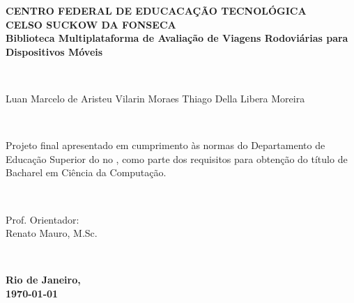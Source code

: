 \documentclass[12pt]{report} %
\begin{document}
	\thispagestyle{empty} %
	\center %
	
	\begin{minipage}{\textwidth}
		\begin{center}
			{\bfseries \large CENTRO FEDERAL DE EDUCACAÇÃO TECNOLÓGICA\\ CELSO SUCKOW DA FONSECA}\\[6em]
			{\bfseries \LARGE Biblioteca Multiplataforma de Avaliação de Viagens Rodoviárias para Dispositivos Móveis}\\[6em]%
		\end{center}
	\end{minipage}\\[6em]
	
	\begin{flushright}
		\begin{minipage}{0.5\textwidth}
			\normalsize
			\raggedleft \normalsize Luan Marcelo de Aristeu Vilarin Moraes
			\raggedleft \normalsize Thiago Della Libera Moreira
		\end{minipage}\\[6em]

	\end{flushright}
	
	\begin{flushright}
		\begin{minipage}{0.5\textwidth}
			\normalsize
			\raggedleft
			Projeto final apresentado em cumprimento às normas do Departamento de Educação Superior do  no , como parte dos requisitos para obtenção do título de Bacharel em Ciência da Computação.
		\end{minipage}\\[6em]
	\end{flushright}
	
	\begin{flushright}
		\begin{minipage}{0.5\textwidth}
			\raggedleft
			Prof. Orientador: \\
			Renato Mauro, M.Sc.
		\end{minipage}\\
	\end{flushright}
	\vfill	
	{\bfseries \large Rio de Janeiro,\\
		\today} %
	
\end{document}
